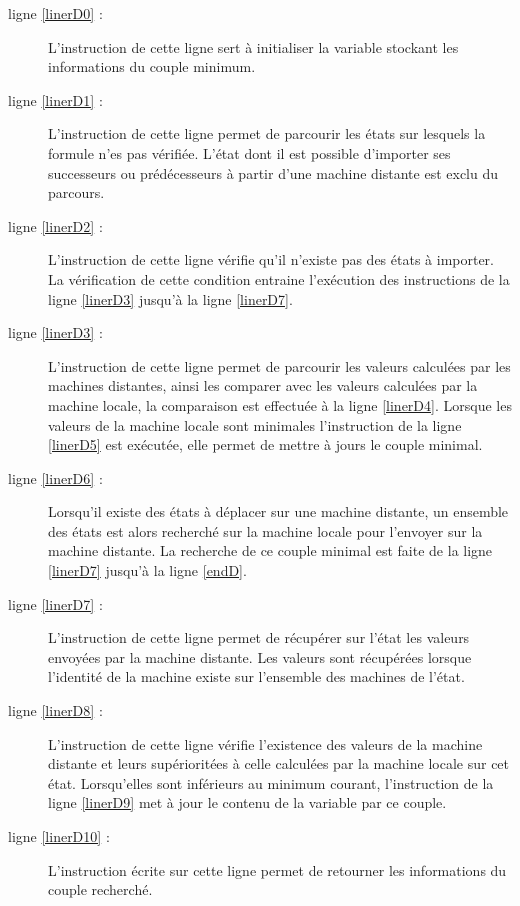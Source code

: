 \begin{description}
	\item[ligne \ref{linerD0} :] L'instruction de cette ligne sert à initialiser la variable stockant les informations du couple minimum.
	
	\item[ligne \ref{linerD1} :] L'instruction de cette ligne permet de parcourir les états \s{\bn{}} sur lesquels la formule n'es pas vérifiée. L'état dont il est possible d'importer ses successeurs ou prédécesseurs à partir d'une machine distante est exclu du parcours.
	\item[ligne \ref{linerD2} :]  L'instruction de cette ligne vérifie qu'il n'existe pas des états à importer. La vérification de cette condition entraine l'exécution des instructions de la ligne \ref{linerD3} jusqu'à la ligne \ref{linerD7}.
	
	\item[ligne \ref{linerD3} :] L'instruction de cette ligne permet de parcourir les valeurs calculées par les machines distantes, ainsi les comparer avec les valeurs calculées par la machine locale, la comparaison est effectuée à la  ligne \ref{linerD4}. Lorsque les valeurs de la machine locale sont minimales l'instruction de la ligne \ref{linerD5}  est exécutée, elle permet de mettre à jours le couple minimal.
	
	\item[ligne \ref{linerD6} :] Lorsqu'il existe des états à déplacer sur une machine distante, un ensemble des états est alors recherché sur la machine locale pour l'envoyer sur la machine distante. La recherche de ce couple minimal est faite de la ligne \ref{linerD7} jusqu'à la ligne \ref{endD}.
	
	\item[ligne \ref{linerD7} :] L'instruction de cette ligne permet de récupérer sur l'état les valeurs envoyées par la machine distante. Les valeurs sont récupérées lorsque l'identité de la machine existe sur l'ensemble des machines de l'état.
	
	\item[ligne \ref{linerD8} :]  L'instruction de cette ligne vérifie l'existence des valeurs de la machine distante et leurs supérioritées à celle calculées par la machine locale sur cet état. Lorsqu'elles sont inférieurs au minimum  courant, l'instruction de la ligne \ref{linerD9} met à jour le contenu de la variable  par ce couple.
	
	\item[ligne \ref{linerD10} :] L'instruction écrite sur cette ligne permet de retourner les informations du couple recherché.
\end{description}